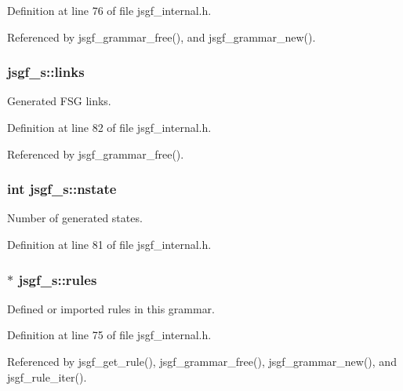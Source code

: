 Definition at line 76 of file jsgf\-\_\-internal.\-h.



Referenced by jsgf\-\_\-grammar\-\_\-free(), and jsgf\-\_\-grammar\-\_\-new().

\subsubsection[{links}]{ jsgf\-\_\-s\-::links}\label{structjsgf__s_a6ee31bac19680f01c413969a75ad838a}


Generated F\-S\-G links. 



Definition at line 82 of file jsgf\-\_\-internal.\-h.



Referenced by jsgf\-\_\-grammar\-\_\-free().

\subsubsection[{nstate}]{\setlength{\rightskip}{0pt plus 5cm}int jsgf\-\_\-s\-::nstate}\label{structjsgf__s_a380c1b82e1bd776438303159e5129773}


Number of generated states. 



Definition at line 81 of file jsgf\-\_\-internal.\-h.

\subsubsection[{rules}]{$\ast$ jsgf\-\_\-s\-::rules}\label{structjsgf__s_af257160279ab56ffca65966aeac18ef9}


Defined or imported rules in this grammar. 



Definition at line 75 of file jsgf\-\_\-internal.\-h.



Referenced by jsgf\-\_\-get\-\_\-rule(), jsgf\-\_\-grammar\-\_\-free(), jsgf\-\_\-grammar\-\_\-new(), and jsgf\-\_\-rule\-\_\-iter().

